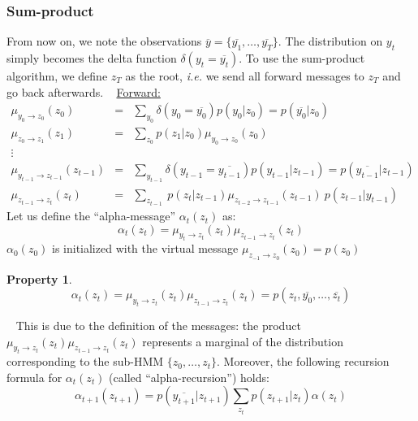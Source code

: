 \documentclass[12pt,a4paper]{report}
\newtheorem{property}[lemma]{Property}
\begin{document}
\subsubsection{Sum-product}
From now on, we note the observations $\overline{y} = \{ \overline{y_1},\ldots,\overline{y_T} \}$. The distribution on $y_t$ simply becomes the delta function $\delta(y_t = \overline{y_t})$.
To use the sum-product algorithm, we define $z_T$ as the root, \textit{i.e.} we send all forward messages to $z_T$ and go back afterwards.
\newline~\newline
\underline{Forward:}
\begin{eqnarray*}
\mu_{y_0\rightarrow z_0}(z_0) & = & \displaystyle \sum_{y_0} \delta(y_0 = \overline{y_0})p(y_0|z_0) = p(\overline{y_0}| z_0)\\
\mu_{z_0\rightarrow z_1}(z_1) & = &  \displaystyle \sum_{z_0} p(z_1|z_0)\mu_{y_0\rightarrow z_0}(z_0) \\
\vdots
\\
\mu_{y_{t-1}\rightarrow z_{t-1}}(z_{t-1}) & = & \displaystyle \sum_{y_{t-1}} \delta(y_{t-1} = \overline{y_{t-1}})p(y_{t-1}|z_{t-1}) = p(\overline{y_{t-1}}| z_{t-1})\\
\mu_{z_{t-1}\rightarrow z_t}(z_t) & = & \underset{z_{t-1}}{\sum}\ p(z_t|z_{t-1})\mu_{z_{t-2}\rightarrow z_{t-1}}(z_{t-1})\ p(z_{t-1}|y_{t-1})
\end{eqnarray*}
Let us define the ``alpha-message'' $\alpha_{t}(z_t)$ as:
\begin{equation*}
\alpha_t(z_t) = \mu_{y_t \rightarrow z_t}(z_t)\mu_{z_{t-1}\rightarrow z_t}(z_t)
\end{equation*}
$\alpha_0(z_0)$ is initialized with the virtual message $\mu_{z_{-1}\rightarrow z_0}(z_0)=p(z_0)$
\begin{property}
\begin{equation*}
\alpha_{t}(z_t) = \mu_{y_t \rightarrow z_t}(z_t)\mu_{z_{t-1}\rightarrow z_t}(z_t) = p(z_t,\overline{y_0},\ldots,\overline{z_t})
\end{equation*}
\end{property}
~\newline
This is due to the definition of the messages: the product $\mu_{y_t \rightarrow z_t}(z_t)\mu_{z_{t-1}\rightarrow z_t}(z_t)$ represents a marginal of the distribution corresponding to the sub-HMM $\{z_0,\ldots,z_t\}$.
\newline
Moreover, the following recursion formula for $\alpha_{t}(z_t)$ (called ``alpha-recursion'') holds:
\begin{equation*}
\alpha_{t+1}(z_{t+1}) = p(\overline{y_{t+1}}|z_{t+1})\displaystyle \sum_{z_t} p(z_{t+1}|z_t) \alpha(z_t)
\end{equation*}
\end{document}
